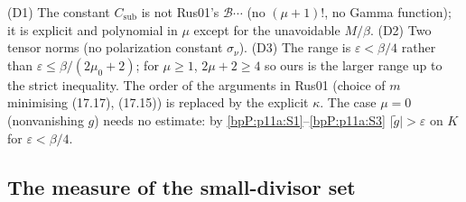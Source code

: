\begin{remark}\label{bpP:p11a:sublevel-dev}
(D1) The constant $C_{\mathrm{sub}}$ is not Rus01's $\mathcal B\cdots$ (no $(\mu+1)!$, no Gamma function); it is explicit and polynomial in $\mu$ except for the unavoidable $M/\beta$. (D2) Two tensor norms (no polarization constant $\sigma_\nu$). (D3) The range is $\varepsilon<\beta/4$ rather than $\varepsilon\le\beta/(2\mu_0+2)$; for $\mu\ge1$, $2\mu+2\ge4$ so ours is the larger range up to the strict inequality. The order of the arguments in Rus01 (choice of $m$ minimising (17.17), (17.15)) is replaced by the explicit $\kappa$. The case $\mu=0$ (nonvanishing $g$) needs no estimate: by \ref{bpP:p11a:S1}--\ref{bpP:p11a:S3} $\lvert\tilde g\rvert>\varepsilon$ on $K$ for $\varepsilon<\beta/4$.
\end{remark}

\subsection{The measure of the small-divisor set}\label{bpP:p11a:sec-dio}


